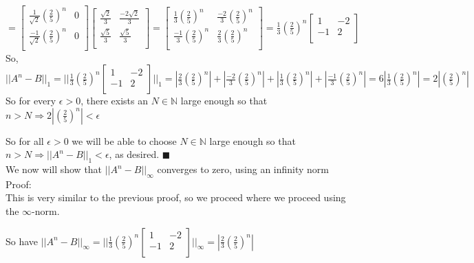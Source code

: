 \documentclass[letterpaper,12pt]{article}
\theoremstyle{definition}
\begin{document}
  $ = \begin{bmatrix}
   \frac{1}{\sqrt{2}}(\frac{2}{5})^n  &  0 \\
   \frac{-1}{\sqrt{2}}(\frac{2}{5})^n &  0 \\
  \end{bmatrix} 
\begin{bmatrix}
   \frac{\sqrt{2}}{3}  &  \frac{-2\sqrt{2}}{3} \\
   \frac{\sqrt{5}}{3}  &  \frac{\sqrt{5}}{3} \\
  \end{bmatrix}=
   \begin{bmatrix}
   \frac{1}{3}(\frac{2}{5})^n  &  \frac{-2}{3}(\frac{2}{5})^n \\
   \frac{-1}{3}(\frac{2}{5})^n  &  \frac{2}{3}(\frac{2}{5})^n\\
  \end{bmatrix}=
  \frac{1}{3}(\frac{2}{5})^n
  \begin{bmatrix}
   1 &  -2 \\
   -1 &  2\\
  \end{bmatrix}$\\
  
  So, $||A^n-B||_1 = || 
  \frac{1}{3}(\frac{2}{5})^n
  \begin{bmatrix}
   1 &  -2 \\
   -1 &  2\\
  \end{bmatrix}    ||_1 = |\frac{2}{3}(\frac{2}{5})^n| + |\frac{-2}{3}(\frac{2}{5})^n| + |\frac{1}{3}(\frac{2}{5})^n| + |\frac{-1}{3}(\frac{2}{5})^n| = 6|\frac{1}{3}(\frac{2}{5})^n| = 2|(\frac{2}{5})^n| $\\
  
 So for every $\epsilon >0$, there exists an $N\in \mathbb{N}$ large enough so that $n > N \Rightarrow 2|(\frac{2}{5})^n| <\epsilon$ 
 
 So for all $\epsilon >0$ we will be able to choose $N\in \mathbb{N}$ large enough so that $n > N \Rightarrow ||A^n-B||_1 <\epsilon$, as desired.  \hfill $\blacksquare$\\

We now will show that $||A^n-B||_{\infty}$ converges to zero, using an infinity norm\\
Proof:\\
This is very similar to the previous proof,  so we proceed where we proceed using the $\infty$-norm.

So have $||A^n-B||_{\infty} = || 
  \frac{1}{3}(\frac{2}{5})^n
  \begin{bmatrix}
   1 &  -2 \\
   -1 &  2\\
  \end{bmatrix}    ||_{\infty} = |\frac{2}{3}(\frac{2}{5})^n|$\\
  
\end{document}
